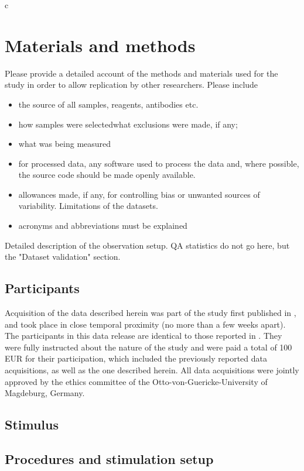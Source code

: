 c\section*{Materials and methods} 
Please provide a detailed account of the methods and materials used for the study in order to allow replication by other researchers.
Please include \begin{itemize}
\item 
the source of all samples, reagents, antibodies etc.
\item 
 how samples were selectedwhat exclusions were made, if any;
\item 
what was being measured
\item 
for processed data, any software used to process the data and, where possible, the source code should be made openly available.\item 

allowances made, if any, for controlling bias or unwanted sources of variability.
Limitations of the datasets.\item 

acronyms and abbreviations must be explained
\end{itemize}

Detailed description of the observation setup. QA statistics do not go here, but the "Dataset validation" section.

\subsection*{Participants}

Acquisition of the data described herein was part of the study first published
in \citet{Hanke_2014}, and took place in close temporal proximity (no more than
a few weeks apart). The participants in this data release are identical to
those reported in \citet{Hanke_2014}.  They were fully instructed about the
nature of the study and were paid a total of 100 EUR for their participation,
which included the previously reported data acquisitions, as well as the one
described herein. All data acquisitions were jointly approved by the ethics
committee of the Otto-von-Guericke-University of Magdeburg, Germany.


\subsection*{Stimulus}

\subsection*{Procedures and stimulation setup}

